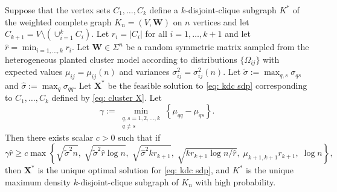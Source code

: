 \documentclass[twoside,11pt]{article}
\newcommand{\bs}{\boldsymbol}
\newcommand{\X}{\bs {X}}
\newcommand{\0}{\bs{0}}
\newcommand{\rbra}[1]{\ensuremath{\left( #1 \right)}} %
\newcommand{\bra}[1]{\ensuremath{\left\{ #1 \right\}}} %
\newcommand{\kdc}{\(k\)-disjoint-clique }
\begin{document}
{\begin{theorem} \label{thm: rec}
	Suppose that the vertex sets \(C_1,\dots,C_k\) define a \(k\)-disjoint-clique subgraph \(K^*\) of the weighted
	complete graph
	\(K_n = (V,\bs W)\) on \(n\) vertices and let \(C_{k+1} = V \setminus \left(\cup_{i=1}^k C_i \right)\). Let \(r_i = |C_i|\) for all
	\(i=1,\dots,k+1\) and let \(\hat{r} = \min_{i=1,\dots,k} r_i\).
	Let \(\bs{W} \in \Sigma^n\)
	be a random symmetric matrix sampled from the heterogeneous planted cluster model according to distributions \(\{\Omega_{ij} \}\) with expected values \(\mu_{ij} = \mu_{ij}(n)\) and variances
	\(\sigma_{ij}^2 = \sigma_{ij}^2(n)\).
	Let $\tilde \sigma := \max_{q,s} \sigma_{qs}$ and
	$\hat \sigma := \max_{q} \sigma_{qq}$.
	Let \(\X^*\) be the feasible solution to \eqref{eq: kdc sdp} corresponding to \(C_1,\dots,C_k\) defined by
	\eqref{eq: cluster X}.
  Let
  $$
    \gamma := \min_{\substack{q,s=1,2,\dots, k \\ q\neq s}} \bra{\mu_{qq} - \mu_{qs}}.
  $$
  Then there exists scalar $c > 0$ such that if
   \begin{equation}\label{eq:smallest_largest}
 		\gamma \hat r \ge %
 		c \max \bra{ \sqrt{\tilde\sigma^2 n},\;
      \sqrt{\tilde\sigma^2 \hat r \log n},\;
      \sqrt{\hat\sigma^2 k r_{k+1}}, \;
      \sqrt{k r_{k+1} \log n / \hat r}, \;      \mu_{k+1, k+1} r_{k+1}, \; \log n
      },
 	\end{equation}
	then \(\bs{X}^*\) is the unique optimal solution for \eqref{eq: kdc sdp}, and \(K^*\) is the unique maximum density \kdc
	subgraph of \(K_n\) with high probability.
\end{theorem}
%

}
\end{document}
